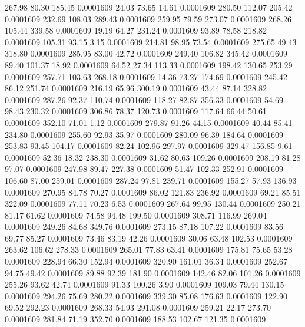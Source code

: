  267.98   80.30  185.45   0.0001609
  24.03   73.65   14.61   0.0001609
 280.50  112.07  205.42   0.0001609
 232.69  108.03  289.43   0.0001609
 259.95   79.59  273.07   0.0001609
 268.26  105.44  339.58   0.0001609
  19.19   64.27  231.24   0.0001609
  93.89   78.58  218.82   0.0001609
 105.31   93.15    3.15   0.0001609
 214.81   98.95   73.54   0.0001609
 275.65   49.43  318.80   0.0001609
 285.95   83.00   42.72   0.0001609
 249.40  106.82  345.42   0.0001609
  89.40  101.37   18.92   0.0001609
  64.52   27.34  113.33   0.0001609
 198.42  130.65  253.29   0.0001609
 257.71  103.63  268.18   0.0001609
  14.36   73.27  174.69   0.0001609
 245.42   86.12  251.74   0.0001609
 216.19   65.96  300.19   0.0001609
  43.44   87.14  328.82   0.0001609
 287.26   92.37  110.74   0.0001609
 118.27   82.87  356.33   0.0001609
  54.69   98.43  230.32   0.0001609
 306.86   78.37  120.73   0.0001609
 117.64   66.44   50.61   0.0001609
 352.10   71.01    1.12   0.0001609
 279.87   91.26   44.15   0.0001609
  40.44   85.41  234.80   0.0001609
 255.60   92.93   35.97   0.0001609
 280.09   96.39  184.64   0.0001609
 253.83   93.45  104.17   0.0001609
  82.24  102.96  297.97   0.0001609
 329.47  156.85    9.61   0.0001609
  52.36   18.32  238.30   0.0001609
  31.62   80.63  109.26   0.0001609
 208.19   81.28   97.07   0.0001609
 247.98   89.47  227.38   0.0001609
  51.47  102.33  252.91   0.0001609
 106.60   87.00  259.01   0.0001609
 287.24   97.81  239.71   0.0001609
 155.27   57.93  136.93   0.0001609
 270.95   84.78   70.27   0.0001609
  86.02  121.83  236.92   0.0001609
  69.21   85.51  322.09   0.0001609
  77.11   70.23    6.53   0.0001609
 267.64   99.95  130.44   0.0001609
 250.21   81.17   61.62   0.0001609
  74.58   94.48  199.50   0.0001609
 308.71  116.99  269.04   0.0001609
 249.26   84.68  349.76   0.0001609
 273.15   87.18  107.22   0.0001609
  83.56   69.77   85.27   0.0001609
  73.46   83.19   42.26   0.0001609
  30.06   63.48  102.53   0.0001609
 263.62  106.62  278.33   0.0001609
 265.01   77.83   63.41   0.0001609
 175.81   75.65   53.28   0.0001609
 228.94   66.30  152.94   0.0001609
 320.90  161.01   36.34   0.0001609
 252.67   94.75   49.42   0.0001609
  89.88   92.39  181.90   0.0001609
 142.46   82.06  101.26   0.0001609
 255.26   93.62   42.74   0.0001609
  91.33  100.26    3.90   0.0001609
 109.03   79.44  130.15   0.0001609
 294.26   75.69  280.22   0.0001609
 339.30   85.08  176.63   0.0001609
 122.90   69.52  292.23   0.0001609
 268.33   54.93  291.08   0.0001609
 259.21   22.17  273.70   0.0001609
 281.84   71.19  352.70   0.0001609
 188.53  102.67  121.35   0.0001609
